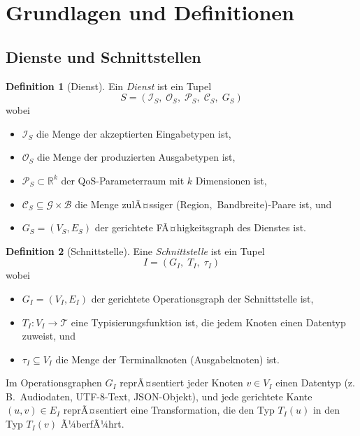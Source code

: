 ﻿\documentclass[a4paper,12pt]{article}
\theoremstyle{definition}
\newtheorem{definition}{Definition}
\begin{document}
\section{Grundlagen und Definitionen}
\label{sec:grundlagen}

\subsection{Dienste und Schnittstellen}

\begin{definition}[Dienst]
\label{def:dienst}
Ein \emph{Dienst} ist ein Tupel
\[
    S = (\mathcal{I}_S,\; \mathcal{O}_S,\; \mathcal{P}_S,\; \mathcal{C}_S,\; G_S)
\]
wobei
\begin{itemize}
    \item $\mathcal{I}_S$ die Menge der akzeptierten Eingabetypen ist,
    \item $\mathcal{O}_S$ die Menge der produzierten Ausgabetypen ist,
    \item $\mathcal{P}_S \subset \mathbb{R}^k$ der QoS-Parameterraum mit $k$ Dimensionen ist,
    \item $\mathcal{C}_S \subseteq \mathcal{G} \times \mathcal{B}$ die Menge zulÃ¤ssiger \mbox{(Region, Bandbreite)}-Paare ist, und
    \item $G_S = (V_S, E_S)$ der gerichtete FÃ¤higkeitsgraph des Dienstes ist.
\end{itemize}
\end{definition}

\begin{definition}[Schnittstelle]
\label{def:schnittstelle}
Eine \emph{Schnittstelle} ist ein Tupel
\[
    I = (G_I,\; T_I,\; \tau_I)
\]
wobei
\begin{itemize}
    \item $G_I = (V_I, E_I)$ der gerichtete Operationsgraph der Schnittstelle ist,
    \item $T_I: V_I \to \mathcal{T}$ eine Typisierungsfunktion ist, die jedem Knoten einen Datentyp zuweist, und
    \item $\tau_I \subseteq V_I$ die Menge der Terminalknoten (Ausgabeknoten) ist.
\end{itemize}
\end{definition}

Im Operationsgraphen $G_I$ reprÃ¤sentiert jeder Knoten $v \in V_I$ einen Datentyp (z.\,B.\ Audiodaten, UTF-8-Text, JSON-Objekt), und jede gerichtete Kante $(u, v) \in E_I$ reprÃ¤sentiert eine Transformation, die den Typ $T_I(u)$ in den Typ $T_I(v)$ Ã¼berfÃ¼hrt.
\end{document}
